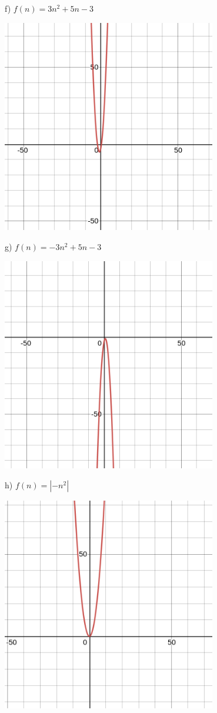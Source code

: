 \documentclass[12pt]{article}
\begin{document}
  f) $f(n) = 3n^{2} + 5n - 3$
  \begin{center}
    \includegraphics[width=0.7\textwidth]{graphics/f.png}\\
  \end{center}
  g) $f(n) = -3n^{2} + 5n - 3$
  \begin{center}
    \includegraphics[width=0.7\textwidth]{graphics/g.png}\\
  \end{center}
  h) $f(n) = |-n^{2}|$
  \begin{center}
    \includegraphics[width=0.7\textwidth]{graphics/h.png}\\
  \end{center}
\end{document}
